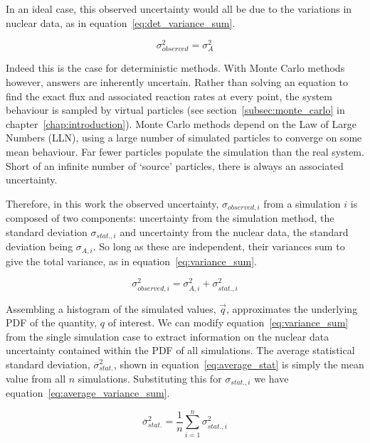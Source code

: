 In an ideal case, this observed uncertainty would all be due to the variations in nuclear data, as in equation~\ref{eq:det_variance_sum}.

\begin{equation}
  \label{eq:det_variance_sum}
  \sigma_{observed}^{2} = \sigma_{A}^{2} 
\end{equation}

Indeed this is the case for deterministic methods. With Monte Carlo methods however, answers are inherently uncertain. Rather than solving an equation to find the exact flux and associated reaction rates at every point, the system behaviour is sampled by virtual particles (see section~\ref{subsec:monte_carlo} in chapter~\ref{chap:introduction}). Monte Carlo methods depend on the Law of Large Numbers (LLN), using a large number of simulated particles to converge on some mean behaviour. Far fewer particles populate the simulation than the real system. Short of an infinite number of `source' particles, there is always an associated uncertainty. 

Therefore, in this work the observed uncertainty, $\sigma_{observed,i}$ from a simulation $i$ is composed of two components: uncertainty from the simulation method, the standard deviation $\sigma_{stat.,i}$ and uncertainty from the nuclear data, the standard deviation being $\sigma_{A,i}$. So long as these are independent, their variances sum to give the total variance, as in equation~\ref{eq:variance_sum}.

\begin{equation}
  \label{eq:variance_sum}
  \sigma_{observed,i}^{2} = \sigma_{A,i}^{2} + \sigma_{stat.,i}^{2}
\end{equation}

Assembling a histogram of the simulated values, $\vec{q}$, approximates the underlying PDF of the quantity, $q$ of interest. We can modify equation~\ref{eq:variance_sum} from the single simulation case to extract information on the nuclear data uncertainty contained within the PDF of all simulations. The average statistical standard deviation, $\overline{\sigma}_{stat.}^{2}$, shown in equation~\ref{eq:average_stat} is simply the mean value from all $n$ simulations. Substituting this for $\sigma_{stat.,i}$ we have equation~\ref{eq:average_variance_sum}. 

\begin{equation}
  \label{eq:average_stat}
  \overline{\sigma}_{stat.}^{2} = \frac{1}{n} \sum^{n}_{i=1}\sigma^{2}_{stat.,i}
\end{equation}

